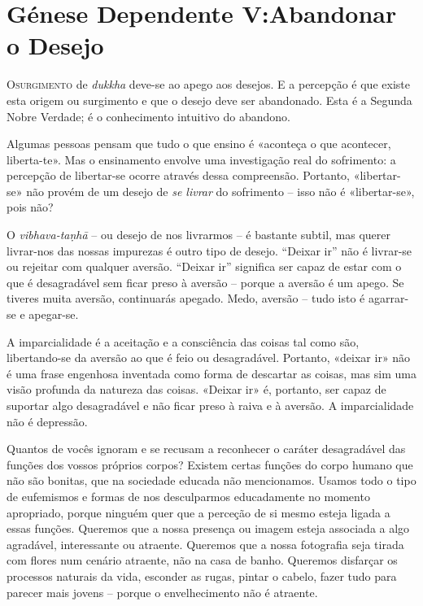 \chapter{Génese Dependente V:\@ Abandonar o Desejo}

\lettrine{O}{\space surgimento} de \emph{dukkha} deve-se ao apego aos desejos.
E a percepção é que existe esta origem ou surgimento e que o desejo deve ser
abandonado. Esta é a Segunda Nobre Verdade; é o conhecimento intuitivo do
abandono.

Algumas pessoas pensam que tudo o que ensino é «aconteça o que acontecer,
liberta-te». Mas o ensinamento envolve uma investigação real do sofrimento: a
percepção de libertar-se ocorre através dessa compreensão. Portanto,
«libertar-se» não provém de um desejo de \emph{se livrar} do sofrimento -- isso
não é «libertar-se», pois não?

O \emph{vibhava-taṇhā} -- ou desejo de nos livrarmos -- é bastante subtil, mas
querer livrar-nos das nossas impurezas é outro tipo de desejo. ``Deixar ir''
não é livrar-se ou rejeitar com qualquer aversão. ``Deixar ir'' significa ser
capaz de estar com o que é desagradável sem ficar preso à aversão -- porque a
aversão é um apego. Se tiveres muita aversão, continuarás apegado. Medo, aversão
-- tudo isto é agarrar-se e apegar-se.

A imparcialidade é a aceitação e a consciência das coisas tal como são,
libertando-se da aversão ao que é feio ou desagradável. Portanto, «deixar ir»
não é uma frase engenhosa inventada como forma de descartar as coisas, mas sim
uma visão profunda da natureza das coisas. «Deixar ir» é, portanto, ser capaz de
suportar algo desagradável e não ficar preso à raiva e à aversão. A
imparcialidade não é depressão.

Quantos de vocês ignoram e se recusam a reconhecer o caráter desagradável das
funções dos vossos próprios corpos? Existem certas funções do corpo humano que
não são bonitas, que na sociedade educada não mencionamos. Usamos todo o tipo de
eufemismos e formas de nos desculparmos educadamente no momento apropriado,
porque ninguém quer que a perceção de si mesmo esteja ligada a essas funções.
Queremos que a nossa presença ou imagem esteja associada a algo agradável,
interessante ou atraente. Queremos que a nossa fotografia seja tirada com flores
num cenário atraente, não na casa de banho. Queremos disfarçar os processos
naturais da vida, esconder as rugas, pintar o cabelo, fazer tudo para parecer
mais jovens -- porque o envelhecimento não é atraente.

